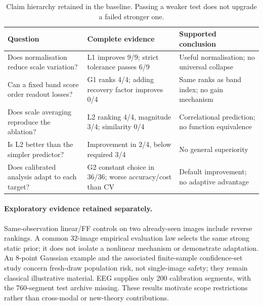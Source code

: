 \begin{table}[t]\centering\small
\caption{Claim hierarchy retained in the baseline. Passing a weaker test does not upgrade a failed stronger one.}\label{tab:claims-main}
\begin{tabular}{p{}p{}p{}}\toprule
Question & Complete evidence & Supported conclusion\\\midrule
Does normalisation reduce scale variation? & L1 improves 9/9; strict tolerance passes 6/9 & Useful normalisation; no universal collapse\\
Can a fixed band score order readout losses? & G1 ranks 4/4; adding recovery factor improves 0/4 & Same ranks as band index; no gain mechanism\\
Does scale averaging reproduce the ablation? & L2 ranking 4/4, magnitude 3/4; similarity 0/4 & Correlational prediction; no function equivalence\\
Is L2 better than the simpler predictor? & Improvement in 2/4, below required 3/4 & No general superiority\\
Does calibrated analysis adapt to each target? & G2 constant choice in 36/36; worse accuracy/cost than CV & Default improvement; no adaptive advantage\\\bottomrule
\end{tabular}
\end{table}

\paragraph{Exploratory evidence retained separately.} Same-observation linear/FF controls on two already-seen images include reverse rankings. A common 32-image empirical evaluation law selects the same strong static prior; it does not isolate a nonlinear mechanism or demonstrate adaptation. An 8-point Gaussian example and the associated finite-sample confidence-set study concern fresh-draw population risk, not single-image safety; they remain classical illustrative material. EEG supplies only 200 calibration segments, with the 760-segment test archive missing. These results motivate scope restrictions rather than cross-modal or new-theory contributions.
